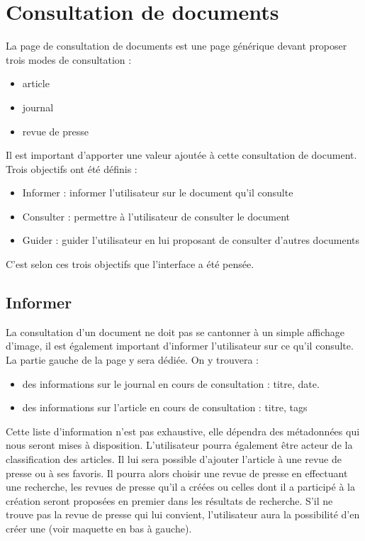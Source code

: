 \section{Consultation de documents}
\label{sec:consultation}

La page de consultation de documents est une page générique devant proposer trois modes de consultation :
\begin{itemize}
\item article
\item journal
\item revue de presse
\end{itemize}

Il est important d’apporter une valeur ajoutée à cette consultation de document. Trois objectifs ont été définis :
\begin{itemize}
\item Informer : informer l’utilisateur sur le document qu’il consulte
\item Consulter : permettre à l’utilisateur de consulter le document
\item Guider : guider l’utilisateur en lui proposant de consulter d’autres documents
\end{itemize}
C’est selon ces trois objectifs que l’interface a été pensée.


\subsection{Informer}
\label{sec:consultation_informer}
	La consultation d’un document ne doit pas se cantonner à un simple affichage d’image, il est également important d’informer l’utilisateur sur ce qu’il consulte. La partie gauche de la page y sera dédiée.
On y trouvera :
\begin{itemize}
\item des informations sur le journal en cours de consultation : titre, date.
\item des informations sur l’article en cours de consultation : titre, tags
\end{itemize}
	Cette liste d’information n’est pas exhaustive, elle dépendra des métadonnées qui nous seront mises à disposition.
	L’utilisateur pourra également être acteur de la classification des articles. Il lui sera possible d’ajouter l’article à une revue de presse ou à ses favoris. Il pourra alors choisir une revue de presse en effectuant une recherche, les revues de presse qu’il a créées ou celles dont il a participé à la création seront proposées en premier dans les résultats de recherche. S’il ne trouve pas la revue de presse qui lui convient, l’utilisateur aura la possibilité d’en créer une (voir maquette en bas à gauche).

